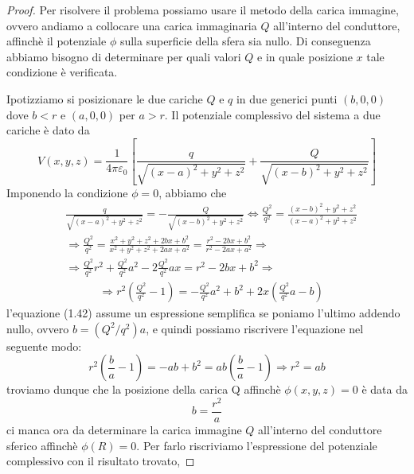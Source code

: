 \begin{proof}
	Per risolvere il problema possiamo usare il metodo della carica immagine, ovvero andiamo a collocare una carica immaginaria $Q$ all'interno del conduttore, affinch\`e il potenziale $\phi$ sulla superficie della sfera sia nullo. Di conseguenza abbiamo bisogno di determinare per quali valori $Q$ e in quale posizione $x$ tale condizione \`e verificata.
\newline

Ipotizziamo si posizionare le due cariche $Q$ e $q$ in due generici punti $(b,0,0)$ dove $b < r$ e $(a,0,0)$ per $a >r$. Il potenziale complessivo del sistema a due cariche \`e dato da 
\begin{equation*}
	V(x,y,z) = \frac{1}{4 \pi \varepsilon_0} \left [ \frac{q}{\sqrt{(x-a)^2 + y^2 + z^2}} + \frac{Q}{\sqrt{(x-b)^2+y^2+z^2}} \right]
\end{equation*}
Imponendo la condizione $\phi = 0$, abbiamo che 
\begin{align*}
	& \frac{q}{\sqrt{(x-a)^2 + y^2 + z^2}} =- \frac{Q}{\sqrt{(x-b)^2+y^2+z^2}} \iff \frac{Q^2}{q^2} = \frac{(x-b)^2 + y^2 + z^2}{(x-a)^2 + y^2 + z^2} \\[0.5cm]
	& \Rightarrow \frac{Q^2}{q^2} = \frac{x^2 + y^2 +z^2 +2bx + b^2}{x^2 + y^2 +z^2 + 2ax + a^2} = \frac{r^2 - 2bx +b^2}{r^2 - 2ax +a^2} 
	\Rightarrow \\[0.5cm]
	& \Rightarrow \frac{Q^2}{q^2}r^2 + \frac{Q^2}{q^2}a^2 - 2\frac{Q^2}{q^2}ax =  r^2 - 2bx +b^2 \Rightarrow 
\end{align*}
\begin{align}
	& \Rightarrow r^2 \left( \frac{Q^2}{q^2}-1 \right) = -\frac{Q^2}{q^2}a^2 +b^2 + 2x \left(\frac{Q^2}{q^2}a - b\right)
\end{align}
l'equazione (1.42) assume un espressione semplifica se poniamo l'ultimo addendo nullo, ovvero $b = (Q^2/q^2)a$, e quindi possiamo riscrivere l'equazione nel seguente modo:
\begin{equation*}
	r^2 \left( \frac{b}{a} -1\right) = -ab + b^2  = ab\left (\frac{b}{a}-1 \right) \Rightarrow r^2 = ab
\end{equation*}
troviamo dunque che la posizione della carica Q affinch\`e $\phi(x,y,z) = 0$ \`e data  da 
\begin{equation*}
\boxed{
	b = \frac{r^2}{a}
	}
\end{equation*}
ci manca ora da determinare la carica immagine $Q$  all'interno del conduttore sferico affinch\`e $\phi(R) = 0$. Per farlo riscriviamo l'espressione del potenziale complessivo con il risultato trovato,

\end{proof}
